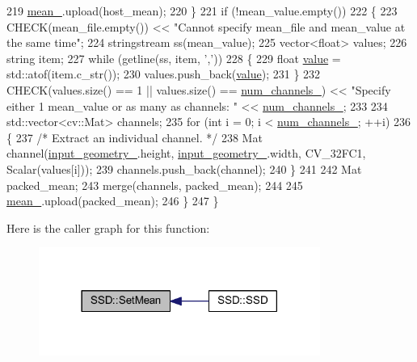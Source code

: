 \begin{DoxyCode}
219         \mbox{\hyperlink{class_s_s_d_a3974a4a620cee93f5523c459482887e2}{mean\_}}.upload(host\_mean);
220     \}
221     \textcolor{keywordflow}{if} (!mean\_value.empty())
222     \{
223         CHECK(mean\_file.empty()) << \textcolor{stringliteral}{"Cannot specify mean\_file and mean\_value at the same time"};
224         stringstream ss(mean\_value);
225         vector<float> values;
226         \textcolor{keywordtype}{string} item;
227         \textcolor{keywordflow}{while} (getline(ss, item, \textcolor{charliteral}{','}))
228         \{
229             \textcolor{keywordtype}{float} \mbox{\hyperlink{struct_g_m_l__pair_aef8797e7d2fc0d2e2f628ce9c2783a6c}{value}} = std::atof(item.c\_str());
230             values.push\_back(\mbox{\hyperlink{struct_g_m_l__pair_aef8797e7d2fc0d2e2f628ce9c2783a6c}{value}});
231         \}
232         CHECK(values.size() == 1 || values.size() == \mbox{\hyperlink{class_s_s_d_affe6f7e948b0040bd958db34758d8ab1}{num\_channels\_}}) << \textcolor{stringliteral}{"Specify either 1
       mean\_value or as many as channels: "} << \mbox{\hyperlink{class_s_s_d_affe6f7e948b0040bd958db34758d8ab1}{num\_channels\_}};
233 
234         std::vector<cv::Mat> channels;
235         \textcolor{keywordflow}{for} (\textcolor{keywordtype}{int} i = 0; i < \mbox{\hyperlink{class_s_s_d_affe6f7e948b0040bd958db34758d8ab1}{num\_channels\_}}; ++i)
236         \{
237             \textcolor{comment}{/* Extract an individual channel. */}
238             Mat channel(\mbox{\hyperlink{class_s_s_d_a3fe828551a5a53a3f43a481ae5d2d96a}{input\_geometry\_}}.height, \mbox{\hyperlink{class_s_s_d_a3fe828551a5a53a3f43a481ae5d2d96a}{input\_geometry\_}}.width, 
      CV\_32FC1, Scalar(values[i]));
239             channels.push\_back(channel);
240         \}
241 
242         Mat packed\_mean;
243         merge(channels, packed\_mean);
244 
245         \mbox{\hyperlink{class_s_s_d_a3974a4a620cee93f5523c459482887e2}{mean\_}}.upload(packed\_mean);
246     \}
247 \}
\end{DoxyCode}
Here is the caller graph for this function\+:\nopagebreak
\begin{figure}[H]
\begin{center}
\leavevmode
\includegraphics[width=261pt]{class_s_s_d_ada3debdd0e04185587f13b44a6b63765_icgraph}
\end{center}
\end{figure}
\mbox{\label{class_s_s_d_aec550d5312257216d93955cdee13a73e}} 

